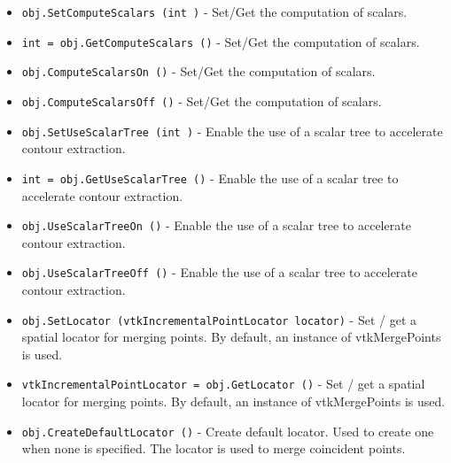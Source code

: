 \begin{itemize}
\item  \verb|obj.SetComputeScalars (int )| -  Set/Get the computation of scalars.

\item  \verb|int = obj.GetComputeScalars ()| -  Set/Get the computation of scalars.

\item  \verb|obj.ComputeScalarsOn ()| -  Set/Get the computation of scalars.

\item  \verb|obj.ComputeScalarsOff ()| -  Set/Get the computation of scalars.

\item  \verb|obj.SetUseScalarTree (int )| -  Enable the use of a scalar tree to accelerate contour extraction.

\item  \verb|int = obj.GetUseScalarTree ()| -  Enable the use of a scalar tree to accelerate contour extraction.

\item  \verb|obj.UseScalarTreeOn ()| -  Enable the use of a scalar tree to accelerate contour extraction.

\item  \verb|obj.UseScalarTreeOff ()| -  Enable the use of a scalar tree to accelerate contour extraction.

\item  \verb|obj.SetLocator (vtkIncrementalPointLocator locator)| -  Set / get a spatial locator for merging points. By default, 
 an instance of vtkMergePoints is used.

\item  \verb|vtkIncrementalPointLocator = obj.GetLocator ()| -  Set / get a spatial locator for merging points. By default, 
 an instance of vtkMergePoints is used.

\item  \verb|obj.CreateDefaultLocator ()| -  Create default locator. Used to create one when none is
 specified. The locator is used to merge coincident points.

\end{itemize}
